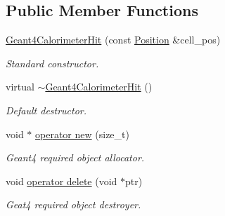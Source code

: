 \subsection*{Public Member Functions}
\begin{DoxyCompactItemize}
\item 
\hyperlink{class_d_d4hep_1_1_simulation_1_1_geant4_calorimeter_hit_abbd57e0eab3a707b644a29c32006228c}{Geant4CalorimeterHit} (const \hyperlink{namespace_d_d4hep_1_1_simulation_ad6fd94b3439e31d1ba4b2e640d578558}{Position} \&cell\_\-pos)
\begin{DoxyCompactList}\small\item\em Standard constructor. \item\end{DoxyCompactList}\item 
virtual \hyperlink{class_d_d4hep_1_1_simulation_1_1_geant4_calorimeter_hit_aa1c4edd85a2375d70f7cfc135f17b9cb}{$\sim$Geant4CalorimeterHit} ()
\begin{DoxyCompactList}\small\item\em Default destructor. \item\end{DoxyCompactList}\item 
void $\ast$ \hyperlink{class_d_d4hep_1_1_simulation_1_1_geant4_calorimeter_hit_a2f0811576b3d642d15805d87a096f598}{operator new} (size\_\-t)
\begin{DoxyCompactList}\small\item\em Geant4 required object allocator. \item\end{DoxyCompactList}\item 
void \hyperlink{class_d_d4hep_1_1_simulation_1_1_geant4_calorimeter_hit_a974038503b2e2fa0d988b802ad5c29e2}{operator delete} (void $\ast$ptr)
\begin{DoxyCompactList}\small\item\em Geat4 required object destroyer. \item\end{DoxyCompactList}\end{DoxyCompactItemize}
